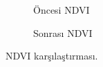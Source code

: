 \documentclass[11pt,a4paper]{article}
\begin{document}
\begin{figure}[H]
  \centering
  \begin{subfigure}[b]{0.48\textwidth}
    \centering
    \caption{Öncesi NDVI}
  \end{subfigure}\hfill
  \begin{subfigure}[b]{0.48\textwidth}
    \centering
    \caption{Sonrası NDVI}
  \end{subfigure}
  \caption{NDVI karşılaştırması.}
  \label{fig:ndvi}
\end{figure}
\FloatBarrier
\end{document}
